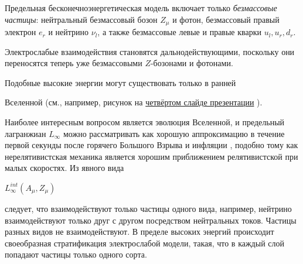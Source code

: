 Предельная бесконечноэнергетическая модель включает только {\em безмассовые частицы}: нейтральный безмассовый бозон $Z_{\mu}$ и фотон, безмассовый правый электрон $e_r $ и нейтрино $\nu_l$, а также безмассовые левые и правые кварки $u_{l}, u_r, d_r $.

Электрослабые взаимодействия становятся дальнодействующими, поскольку они переносятся теперь уже безмассовыми $Z$-бозонами и фотонами. 



%






%










Подобные высокие энергии могут существовать  только в ранней 

Вселенной (см., например, рисунок на \href{http://crimea.bitp.kiev.ua/reg/files/gorbunov.pdf#Navigation3}{четвёртом слайде презентации} \cite{gromov:Gor-2013}).

Наиболее интересным вопросом является эволюция Вселенной, и предельный лагранжиан $L_{\infty}$ можно рассматривать как хорошую аппроксимацию в течение первой секунды после горячего Большого Взрыва и инфляции   \cite{gromov:L-1990, gromov:GR-2011}, подобно тому как нерелятивистская механика является хорошим приближением релятивистской при малых скоростях. Из явного вида %

$L_{\infty}^{int}(A_{\mu},Z_{\mu})$

следует, что взаимодействуют только частицы одного вида, например, нейтрино взаимодействуют только друг с другом посредством нейтральных токов. Частицы разных видов не взаимодействуют. В пределе высоких энергий происходит своеобразная стратификация электрослабой модели, такая, что в каждый слой попадают частицы только одного сорта.





